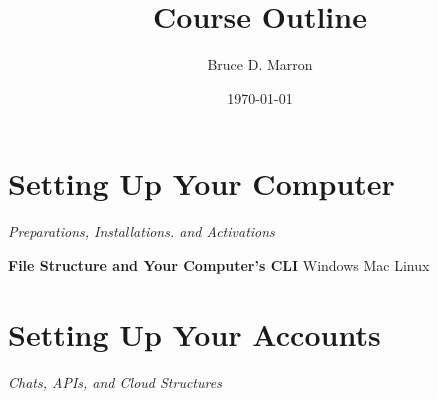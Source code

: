\documentclass[12pt, letterpaper]{article}
\title{\vspace{-15mm}\fontsize{14pt}{10pt}
                    \selectfont \textbf{Course Outline}   %
                    \vspace{-7mm}
      }
\author{
     \normalsize Bruce D. Marron \\                     %
     \vspace{-5mm}
}
\date{\normalsize \today}
\begin{document}
\begin{singlespacing}
\end{singlespacing}
\thispagestyle{fancy}                            %





\section{Setting Up Your Computer}

\large
\begin{flushleft}
\textit{Preparations, Installations. and Activations}
\end{flushleft}
\normalsize

\begin{outline}[enumerate]

\1 \textbf{File Structure and Your Computer's CLI}
\2 Windows
\2 Mac
\2 Linux

\1 \textbf{}
\end{outline}

\section{Setting Up Your Accounts}

\large
\begin{flushleft}
\textit{Chats, APIs, and Cloud Structures}
\end{flushleft}
\normalsize
\end{document}
